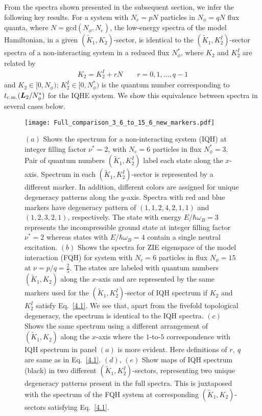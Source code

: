 \documentclass[prb,aps,epsfig,longbibliography,twocolumn]{revtex4-1}
\newcommand{\bsym}[1]{\boldsymbol{#1}}
\newcommand{\np}{N_{\phi}}
\begin{document}
From the spectra shown presented in the subsequent section, we infer the following key results. For a system with $N_e=pN$ particles in $\np=qN$ flux quanta, where $N=\text{gcd}(\np,N_e)$, the low-energy spectra of the model Hamiltonian, in a given $(\tilde{K}_1,K_2)$-sector, is identical to the $(\tilde{K}_1,K_2^{I})$-sector spectra of a non-interacting system in a reduced flux $\np^*$, where $K_2$ and $K^I_2$ are related by
\begin{gather}
 K_2=K_2^{I} + rN\quad \quad\text{}r=0,1,\dots,q-1 \label{4.1}
\end{gather}
and $K_2\in [0,\np)$;  $K_2^{I}\in [0,\np^{*})$ is the quantum number corresponding to $t_{\rm c.m.}(\bsym{L}_2/\np^*)$ for the IQHE system. We show this equivalence between spectra in several cases below. 

\begin{figure}[h!]
	\texttt{[image: Full\_comparison\_3\_6\_to\_15\_6\_new\_markers.pdf]}
	\caption{
  $(a)$ Shows the spectrum for a non-interacting system (IQH) at integer filling factor $\nu^{*}=2$, with $N_e=6$ particles in flux $\np^{*}=3$. Pair of quantum numbers $(\tilde{K}_1,K_2^{I})$ label each state along the $x$-axis. Spectrum in each $(\tilde{K}_1,K_2^{I})$-sector is represented by a different marker. In addition, different colors  are assigned for unique degeneracy patterns along the $y$-axis. Spectra with red and blue markers have degeneracy pattern of $(1,1,2,4,2,1,1)$ and  $(1,2,3,2,1)$, respectively. The state with energy $E/\hbar\omega_B=3$ represents the incompressible ground state at integer filling factor $\nu^{*}=2$  whereas states with $E/\hbar\omega_B=4$ contain a single neutral excitation.  $(b)$ Shows the spectra for ZIE eigenspace of the model interaction (FQH) for system with $N_e=6$ particles in flux $\np=15$ at $\nu=p/q=\frac{2}{5}$. The states are labeled with quantum numbers $(\tilde{K}_1,K_2)$ along the $x$-axis and are represented by the same markers used for the $(\tilde{K}_1,K_2^{I})$-sector of IQH spectrum if $K_2$ and $K_2^{I}$ satisfy Eq.~\eqref{4.1}. We see that, apart from the fivefold topological degeneracy, the spectrum is identical to the IQH spectra. $(c)$ Shows the same spectrum using a different arrangement of $(\tilde{K}_1,K_2)$ along the $x$-axis where the $1$-to-$5$ correspondence with IQH spectrum in panel $(a)$ is more evident. Here definitions of $r,\ q$ are same as in Eq.~\eqref{4.1}. $(d)$, $(e)$ Show  maps of IQH spectrum (black) in two different $(\tilde{K}_1,K_2^{I})$-sectors, representing two unique degeneracy patterns present in the full spectra. This is juxtaposed with the spectrum of the FQH system at corresponding $(\tilde{K}_1,K_2)$-sectors satisfying Eq.~\eqref{4.1}.}\label{fig3}
\end{figure}
\end{document}
